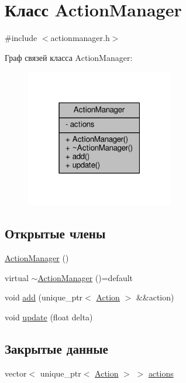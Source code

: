 \hypertarget{class_action_manager}{}\section{Класс Action\+Manager}
\label{class_action_manager}


{\ttfamily \#include $<$actionmanager.\+h$>$}



Граф связей класса Action\+Manager\+:
\nopagebreak
\begin{figure}[H]
\begin{center}
\leavevmode
\includegraphics[width=183pt]{d3/df8/class_action_manager__coll__graph}
\end{center}
\end{figure}
\subsection*{Открытые члены}
\begin{DoxyCompactItemize}
\item 
\hyperlink{class_action_manager_a7d0c405d568795fba0c51f411e77b821}{Action\+Manager} ()
\item 
virtual \hyperlink{class_action_manager_a2fb6c58c581225959d8dfddfd386c9b3}{$\sim$\+Action\+Manager} ()=default
\item 
void \hyperlink{class_action_manager_a52f8cabe9b3fd9676e0e082ba8b741c3}{add} (unique\+\_\+ptr$<$ \hyperlink{class_action}{Action} $>$ \&\&action)
\item 
void \hyperlink{class_action_manager_a1f8ccc02cbf26b3659a08d2e7a91fdac}{update} (float delta)
\end{DoxyCompactItemize}
\subsection*{Закрытые данные}
\begin{DoxyCompactItemize}
\item 
vector$<$ unique\+\_\+ptr$<$ \hyperlink{class_action}{Action} $>$ $>$ \hyperlink{class_action_manager_a1d425cc776debdc5f32d269ee7e532bb}{actions}
\end{DoxyCompactItemize}


